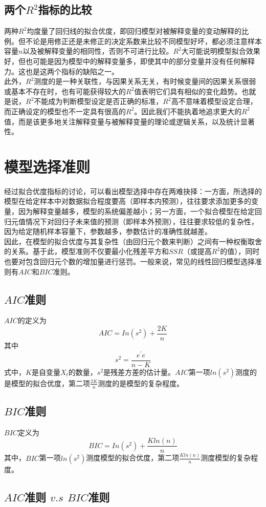 \documentclass[12pt,a4paper]{article}
\begin{document}
\subsection{两个$R^{2}$指标的比较}
\indent
两种$R^{2}$均度量了回归线的拟合优度，即回归模型对被解释变量的变动解释的比例。但不论是用修正还是未修正的决定系数来比较不同模型好坏，都必须注意样本容量$n$以及被解释变量的相同性，否则不可进行比较。$R^{2}$大可能说明模型拟合效果好，但也可能是因为模型中的解释变量多，即使其中的部分变量并没有任何解释力。这也是这两个指标的缺陷之一。\\
\indent
此外，$R^{2}$测度的是一种关联性，与因果关系无关，有时候变量间的因果关系很弱或基本不存在时，也有可能获得较大的$R^{2}$值表明它们具有相似的变化趋势。也就是说，$R^{2}$不能成为判断模型设定是否正确的标准，$R^{2}$高不意味着模型设定合理，而正确设定的模型也不一定具有很高的$R^{2}$。因此我们不能执着地追求更大的$R^{2}$值，而是该更多地关注解释变量与被解释变量的理论或逻辑关系，以及统计显著性。
 \section{模型选择准则}
经过拟合优度指标的讨论，可以看出模型选择中存在两难抉择：一方面，所选择的模型在给定样本中对数据拟合程度要高（即样本内预测），往往要求添加更多的变量，因为解释变量越多，模型的系统偏差越小；另一方面，一个拟合模型在给定回归元值情况下对回归子未来值的预测（即样本外预测），往往要求较低的复杂性，因为给定随机样本容量下，参数越多，参数估计的准确性就越差。\\
 \indent
因此，在模型的拟合优度与其复杂性（由回归元个数来判断）之间有一种权衡取舍的关系。基于此，模型准则不仅要最小化残差平方和$SSR$（或提高$R^{2}$的值），同时也要对包含回归元个数的增加量进行惩罚。一般来说，常见的线性回归模型选择准则有$AIC$和$BIC$准则。
\subsection{$AIC$准则}
 \indent
$AIC$的定义为
$$AIC=In(s^{2})+\frac{2K}{n}$$
其中
$$s^{2}=\frac{e^{'}e}{n-K}$$
式中，$K$是自变量$X_{t}$的数量，$s^{2}$是残差方差的估计量。$AIC$第一项$ln(s^{2})$测度的是模型的拟合优度，第二项$\frac{2K}{n}$测度的是模型的复杂程度。
\subsection{$BIC$准则}
 \indent
$BIC$定义为\\
$$BIC=In(s^{2})+\frac{Kln(n)}{n}$$
其中，$BIC$第一项$ln(s^2)$测度模型的拟合优度，第二项$\frac{Kln(n)}{n}$测度模型的复杂程度。
\subsection{$AIC$准则 $v.s$ $BIC$准则}
\end{document}
